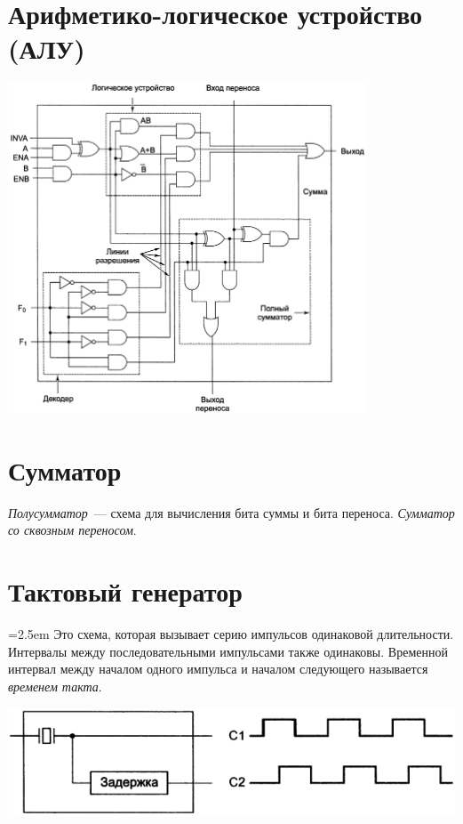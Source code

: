 \begin{minipage}{0.3\textwidth}
\end{minipage}\medskip



\section{Арифметико-логическое устройство (АЛУ)}
\begin{center}
  \includegraphics[width=0.8\textwidth]{images/ALU.png}
\end{center}



\section{Сумматор}
\emph{Полусумматор}~--- схема для вычисления бита суммы и бита переноса. \emph{Сумматор со сквозным переносом}.



\section{Тактовый генератор}
\noindent\begin{minipage}{0.5\columnwidth}\parindent=2.5em
  Это схема, которая вызывает серию импульсов одинаковой длительности. Интервалы между последовательными импульсами также одинаковы. Временной интервал между началом одного импульса и началом следующего называется \emph{временем такта}.
\end{minipage}\hfill\begin{minipage}{0.46\columnwidth}
  \includegraphics[width=\columnwidth]{images/clock_generator.png}
\end{minipage}

